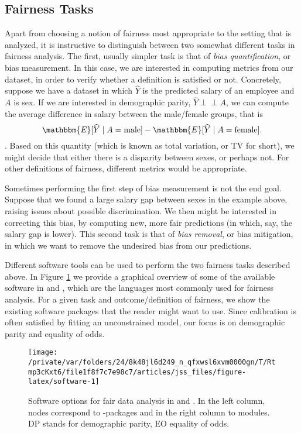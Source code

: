 \documentclass[
  nojss]{jss}
\begin{document}
\hypertarget{fairness-tasks}{%
\subsection{Fairness Tasks}\label{fairness-tasks}}

Apart from choosing a notion of fairness most appropriate to the setting
that is analyzed, it is instructive to distinguish between two somewhat
different tasks in fairness analysis. The first, usually simpler task is
that of \emph{bias quantification}, or bias measurement. In this case,
we are interested in computing metrics from our dataset, in order to
verify whether a definition is satisfied or not. Concretely, suppose we
have a dataset in which \(\widehat{Y}\) is the predicted salary of an
employee and \(A\) is sex. If we are interested in demographic parity,
\(\widehat{Y} {\perp\!\!\!\perp}A\), we can compute the average
difference in salary between the male/female groups, that is
\[\mathbbm{E}[\widehat{Y} \mid A = \text{male}] - \mathbbm{E}[\widehat{Y} \mid A = \text{female}].\].
Based on this quantity (which is known as total variation, or TV for
short), we might decide that either there is a disparity between sexes,
or perhaps not. For other definitions of fairness, different metrics
would be appropriate.

Sometimes performing the first step of bias measurement is not the end
goal. Suppose that we found a large salary gap between sexes in the
example above, raising issues about possible discrimination. We then
might be interested in correcting this bias, by computing new, more fair
predictions (in which, say, the salary gap is lower). This second task
is that of \emph{bias removal}, or bias mitigation, in which we want to
remove the undesired bias from our predictions.

Different software tools can be used to perform the two fairness tasks
described above. In Figure \ref{fig:software} we provide a graphical
overview of some of the available software in  and
, which are the languages most commonly used for fairness
analysis. For a given task and outcome/definition of fairness, we show
the existing software packages that the reader might want to use. Since
calibration is often satisfied by fitting an unconstrained model, our
focus is on demographic parity and equality of odds.

\begin{CodeChunk}
\begin{figure}

{\centering \texttt{[image: /private/var/folders/24/8k48jl6d249\_n\_qfxwsl6xvm0000gn/T/Rtmp3cKxt6/file1f8f7c7e98c7/articles/jss\_files/figure-latex/software-1]} 

}

\caption{Software options for fair data analysis in  and . In the left column, nodes correspond to -packages and in the right column to  modules. DP stands for demographic parity, EO equality of odds.}\label{fig:software}
\end{figure}
\end{CodeChunk}
\end{document}
